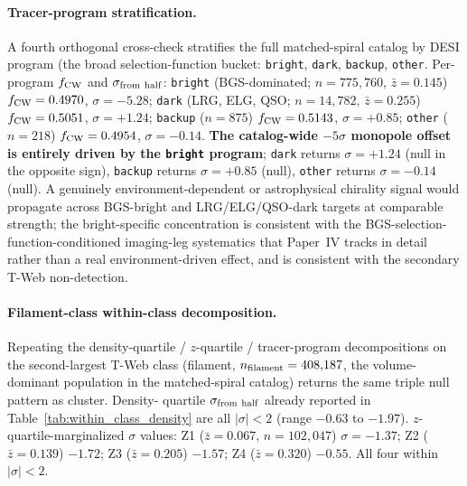 \documentclass[twocolumn,linenumbers]{aastex702}
\begin{document}
\paragraph{Tracer-program stratification.} A fourth orthogonal
cross-check stratifies the full matched-spiral catalog by DESI
program (the broad selection-function bucket: \texttt{bright},
\texttt{dark}, \texttt{backup}, \texttt{other}.
Per-program $f_{\rm CW}$ and $\sigma_{\rm from\ half}$:
\texttt{bright} (BGS-dominated; $n = 775{,}760$, $\bar z = 0.145$)
$f_{\rm CW} = 0.4970$, $\sigma = -5.28$; \texttt{dark} (LRG, ELG, QSO;
$n = 14{,}782$, $\bar z = 0.255$) $f_{\rm CW} = 0.5051$,
$\sigma = +1.24$; \texttt{backup} ($n = 875$) $f_{\rm CW} = 0.5143$,
$\sigma = +0.85$; \texttt{other} ($n = 218$) $f_{\rm CW} = 0.4954$,
$\sigma = -0.14$. \textbf{The catalog-wide $-5\sigma$ monopole offset is
entirely driven by the \texttt{bright} program}; \texttt{dark} returns
$\sigma = +1.24$ (null in the opposite sign), \texttt{backup} returns
$\sigma = +0.85$ (null), \texttt{other} returns $\sigma = -0.14$
(null). A genuinely environment-dependent or astrophysical chirality
signal would propagate across BGS-bright and LRG/ELG/QSO-dark targets
at comparable strength; the bright-specific concentration is consistent
with the BGS-selection-function-conditioned imaging-leg systematics
that Paper~IV tracks in detail rather than a real environment-driven
effect, and is consistent with the secondary T-Web non-detection.

\paragraph{Filament-class within-class decomposition.} Repeating the
density-quartile / $z$-quartile / tracer-program decompositions on
the second-largest T-Web class (filament, $n_{\rm filament} =
408{,}187$, the volume-dominant population in the matched-spiral
catalog) returns the same triple null pattern as cluster. Density-
quartile $\sigma_{\rm from\ half}$ already reported in
Table~\ref{tab:within_class_density} are all $|\sigma| < 2$ (range
$-0.63$ to $-1.97$). $z$-quartile-marginalized $\sigma$ values:
Z1 ($\bar z = 0.067$, $n = 102{,}047$) $\sigma = -1.37$;
Z2 ($\bar z = 0.139$) $-1.72$; Z3 ($\bar z = 0.205$) $-1.57$;
Z4 ($\bar z = 0.320$) $-0.55$. All four within $|\sigma| < 2$.
\end{document}
